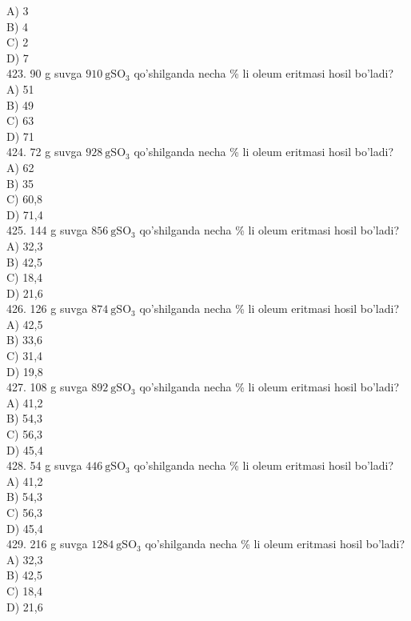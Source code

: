 A) 3\\
B) 4\\
C) 2\\
D) 7\\
423. 90 g suvga $910 \mathrm{~g} \mathrm{SO}_{3}$ qo'shilganda necha \% li oleum eritmasi hosil bo'ladi?\\
A) 51\\
B) 49\\
C) 63\\
D) 71\\
424. 72 g suvga $928 \mathrm{~g} \mathrm{SO}_{3}$ qo'shilganda necha \% li oleum eritmasi hosil bo'ladi?\\
A) 62\\
B) 35\\
C) 60,8\\
D) 71,4\\
425. 144 g suvga $856 \mathrm{~g} \mathrm{SO}_{3}$ qo'shilganda necha \% li oleum eritmasi hosil bo'ladi?\\
A) 32,3\\
B) 42,5\\
C) 18,4\\
D) 21,6\\
426. 126 g suvga $874 \mathrm{~g} \mathrm{SO}_{3}$ qo'shilganda necha \% li oleum eritmasi hosil bo'ladi?\\
A) 42,5\\
B) 33,6\\
C) 31,4\\
D) 19,8\\
427. 108 g suvga $892 \mathrm{~g} \mathrm{SO}_{3}$ qo'shilganda necha \% li oleum eritmasi hosil bo'ladi?\\
A) 41,2\\
B) 54,3\\
C) 56,3\\
D) 45,4\\
428. 54 g suvga $446 \mathrm{~g} \mathrm{SO}_{3}$ qo'shilganda necha \% li oleum eritmasi hosil bo'ladi?\\
A) 41,2\\
B) 54,3\\
C) 56,3\\
D) 45,4\\
429. 216 g suvga $1284 \mathrm{~g} \mathrm{SO}_{3}$ qo'shilganda necha \% li oleum eritmasi hosil bo'ladi?\\
A) 32,3\\
B) 42,5\\
C) 18,4\\
D) 21,6\\
